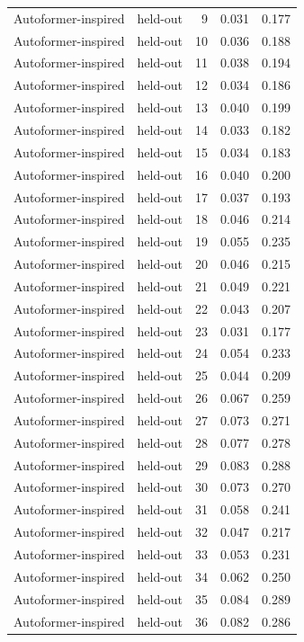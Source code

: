 \begin{tabular}{llrrr}
Autoformer-inspired & held-out & 9 & 0.031 & 0.177 \\
Autoformer-inspired & held-out & 10 & 0.036 & 0.188 \\
Autoformer-inspired & held-out & 11 & 0.038 & 0.194 \\
Autoformer-inspired & held-out & 12 & 0.034 & 0.186 \\
Autoformer-inspired & held-out & 13 & 0.040 & 0.199 \\
Autoformer-inspired & held-out & 14 & 0.033 & 0.182 \\
Autoformer-inspired & held-out & 15 & 0.034 & 0.183 \\
Autoformer-inspired & held-out & 16 & 0.040 & 0.200 \\
Autoformer-inspired & held-out & 17 & 0.037 & 0.193 \\
Autoformer-inspired & held-out & 18 & 0.046 & 0.214 \\
Autoformer-inspired & held-out & 19 & 0.055 & 0.235 \\
Autoformer-inspired & held-out & 20 & 0.046 & 0.215 \\
Autoformer-inspired & held-out & 21 & 0.049 & 0.221 \\
Autoformer-inspired & held-out & 22 & 0.043 & 0.207 \\
Autoformer-inspired & held-out & 23 & 0.031 & 0.177 \\
Autoformer-inspired & held-out & 24 & 0.054 & 0.233 \\
Autoformer-inspired & held-out & 25 & 0.044 & 0.209 \\
Autoformer-inspired & held-out & 26 & 0.067 & 0.259 \\
Autoformer-inspired & held-out & 27 & 0.073 & 0.271 \\
Autoformer-inspired & held-out & 28 & 0.077 & 0.278 \\
Autoformer-inspired & held-out & 29 & 0.083 & 0.288 \\
Autoformer-inspired & held-out & 30 & 0.073 & 0.270 \\
Autoformer-inspired & held-out & 31 & 0.058 & 0.241 \\
Autoformer-inspired & held-out & 32 & 0.047 & 0.217 \\
Autoformer-inspired & held-out & 33 & 0.053 & 0.231 \\
Autoformer-inspired & held-out & 34 & 0.062 & 0.250 \\
Autoformer-inspired & held-out & 35 & 0.084 & 0.289 \\
Autoformer-inspired & held-out & 36 & 0.082 & 0.286 \\

\end{tabular}

